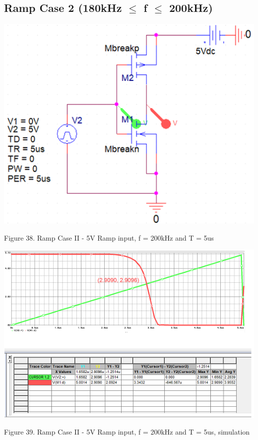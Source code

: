 \documentclass[conference]{IEEEtran}
\begin{document}
\subsection{Ramp Case 2 (180kHz $\leq$ f $\leq$ 200kHz)}

\begin{center}
    \centerline{\includegraphics[scale = 0.6]{figures/rampcase2_circuit.png}}
    Figure 38. Ramp Case II - 5V Ramp input, f = 200kHz and T = 5us
\end{center}

\begin{center}
    \centerline{\includegraphics[scale = 0.6]{figures/rampcase2_results.png}}
    Figure 39. Ramp Case II - 5V Ramp input, f = 200kHz and T = 5us, simulation
\end{center}
\end{document}
